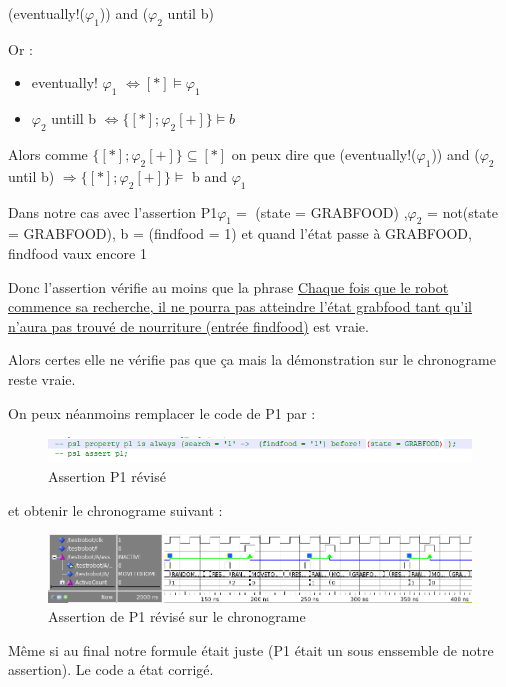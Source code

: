 \documentclass{article}
\newcommand{\sautligne}{
\textbf{\vspace{5mm}}
}
\begin{document}
(eventually!($ \varphi_1$)) and ($ \varphi_2$ until b) 

\vspace{2mm} 

Or : 
\begin{itemize}
\item eventually! $ \varphi_1$ $ \Leftrightarrow [*] \models \varphi_1 $ 
\item $ \varphi_2$ untill b $ \Leftrightarrow 
\{[*] ;  \varphi_2[+]\}\models b$
\end{itemize}

Alors comme $\{[*] ;  \varphi_2[+]\} \subseteq [*] $ on peux dire que (eventually!($ \varphi_1$)) and ($ \varphi_2$ until b) $ \Rightarrow \{[*] ;  \varphi_2[+]\}\models$ b and $\varphi_1$

\sautligne


Dans notre cas avec l'assertion P1$ \varphi_1 =$ (state = GRABFOOD) ,$ \varphi_2$ = not(state = GRABFOOD), b = (findfood = 1) et quand l'état passe à GRABFOOD, findfood vaux encore 1
\sautligne


Donc l'assertion vérifie au moins que la phrase \uline{Chaque fois que le robot commence sa recherche, il ne pourra pas atteindre l'état 
grabfood tant qu'il n'aura pas trouvé de nourriture (entrée findfood)} est vraie.

Alors certes elle ne vérifie pas que ça mais la démonstration sur le chronograme reste vraie.

On peux néanmoins remplacer le code de P1 par : 

\begin{figure}[!h]
\centering
\includegraphics[scale=0.6]{PSL/preuveCode.PNG}
\caption{Assertion P1 révisé }
\end{figure} 

et obtenir le chronograme suivant :

\begin{figure}[!h]
\centering
\includegraphics[scale=0.5]{PSL/preuve.PNG}
\caption{Assertion  de P1 révisé sur le chronograme }
\end{figure}

Même si au final notre formule était juste (P1 était un sous enssemble de notre assertion). Le code a état corrigé.
\end{document}
